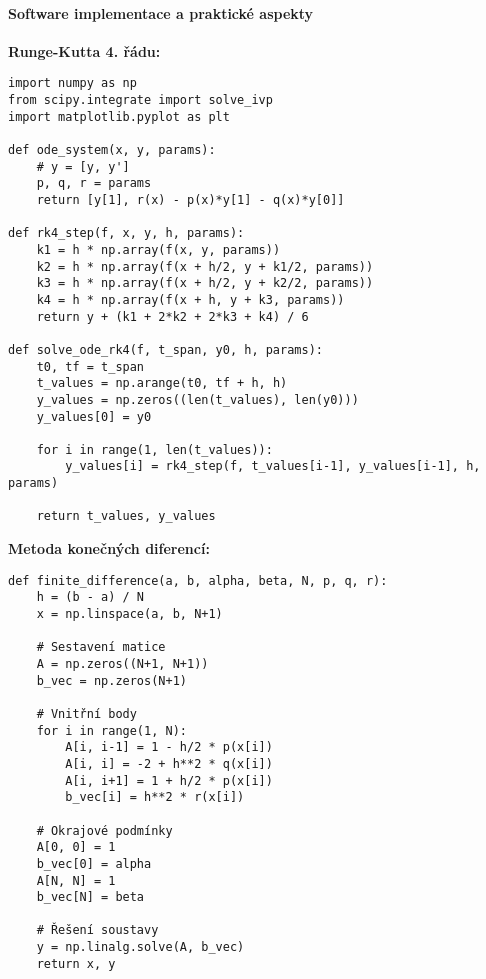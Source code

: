 \paragraph{Software implementace a praktické aspekty}

\begin{example}
\label{ex:python-implementace}

\noindent\textbf{Runge-Kutta 4. řádu:}
\begin{verbatim}
import numpy as np
from scipy.integrate import solve_ivp
import matplotlib.pyplot as plt

def ode_system(x, y, params):
    # y = [y, y']
    p, q, r = params
    return [y[1], r(x) - p(x)*y[1] - q(x)*y[0]]

def rk4_step(f, x, y, h, params):
    k1 = h * np.array(f(x, y, params))
    k2 = h * np.array(f(x + h/2, y + k1/2, params))
    k3 = h * np.array(f(x + h/2, y + k2/2, params))
    k4 = h * np.array(f(x + h, y + k3, params))
    return y + (k1 + 2*k2 + 2*k3 + k4) / 6

def solve_ode_rk4(f, t_span, y0, h, params):
    t0, tf = t_span
    t_values = np.arange(t0, tf + h, h)
    y_values = np.zeros((len(t_values), len(y0)))
    y_values[0] = y0
    
    for i in range(1, len(t_values)):
        y_values[i] = rk4_step(f, t_values[i-1], y_values[i-1], h, params)
    
    return t_values, y_values
\end{verbatim}

\vspace{1\baselineskip}

\noindent\textbf{Metoda konečných diferencí:}
\begin{verbatim}
def finite_difference(a, b, alpha, beta, N, p, q, r):
    h = (b - a) / N
    x = np.linspace(a, b, N+1)
    
    # Sestavení matice
    A = np.zeros((N+1, N+1))
    b_vec = np.zeros(N+1)
    
    # Vnitřní body
    for i in range(1, N):
        A[i, i-1] = 1 - h/2 * p(x[i])
        A[i, i] = -2 + h**2 * q(x[i])
        A[i, i+1] = 1 + h/2 * p(x[i])
        b_vec[i] = h**2 * r(x[i])
    
    # Okrajové podmínky
    A[0, 0] = 1
    b_vec[0] = alpha
    A[N, N] = 1
    b_vec[N] = beta
    
    # Řešení soustavy
    y = np.linalg.solve(A, b_vec)
    return x, y
\end{verbatim}


\end{example}
